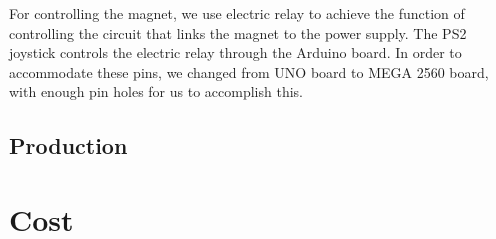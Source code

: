 \documentclass{article}
\begin{document}
For controlling the magnet, we use electric relay to achieve the function of controlling the circuit that links the magnet to the power supply. The PS2 joystick controls the electric relay through the Arduino board. In order to accommodate these pins, we changed from UNO board to MEGA 2560 board, with enough pin holes for us to accomplish this.


\subsection{Production}
\begin{figure}[H]
\centering
{}
\end{figure}




\section{Cost}
\end{document}
